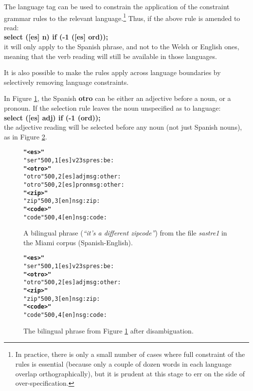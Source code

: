 \documentclass[11pt]{article}
\begin{document}
The language tag can be used to constrain the application of the constraint grammar rules to the relevant language.\footnote{In practice, there is only a small number of cases where full constraint of the rules is essential (because only a couple of dozen words in each language overlap orthographically), but it is prudent at this stage to err on the side of over-specification.}  Thus, if the above rule is amended to read:\\
\indent\textbf{select ([es] n) if (-1 ([es] ord));} \\
it will only apply to the Spanish phrase, and not to the Welsh or English ones, meaning that the verb reading will still be available in those languages.

It is also possible to make the rules apply across language boundaries by selectively removing language constraints.

In Figure \ref{otro}, the Spanish \textbf{otro} can be either an adjective before a noun, or a pronoun.  If the selection rule leaves the noun unspecified as to language: \\
\indent\textbf{select ([es] adj) if (-1 (ord));} \\
the adjective reading will be selected before any noun (not just Spanish nouns), as in Figure \ref{otro1}.

\begin{figure}[!hbtp]
\centering
\begin{footnotesize}
\begin{alltt}
\normalfont
\textbf{"<es>"}
    "ser"  {500,1} [es] v 23s pres :be:
\textbf{"<otro>"}
    "otro"  {500,2} [es] adj m sg :other:
    "otro"  {500,2} [es] pron m sg :other:
\textbf{"<zip>"}
    "zip"  {500,3} [en] n sg :zip:
\textbf{"<code>"}
    "code"  {500,4} [en] n sg :code:
\end{alltt}
\end{footnotesize}
\caption{A bilingual phrase (\textit{``it's a different zipcode''}) from the file \textit{sastre1} in the Miami corpus (Spanish-English).}
\label{otro}
\end{figure}

\begin{figure}[!hbtp]
\centering
\begin{footnotesize}
\begin{alltt}
\normalfont
\textbf{"<es>"}
    "ser"  {500,1} [es] v 23s pres :be:
\textbf{"<otro>"}
    "otro"  {500,2} [es] adj m sg :other:
\textbf{"<zip>"}
    "zip"  {500,3} [en] n sg :zip:
\textbf{"<code>"}
    "code"  {500,4} [en] n sg :code:
\end{alltt}
\end{footnotesize}
\caption{The bilingual phrase from Figure \ref{otro} after disambiguation.}
\label{otro1}
\end{figure}
\end{document}
